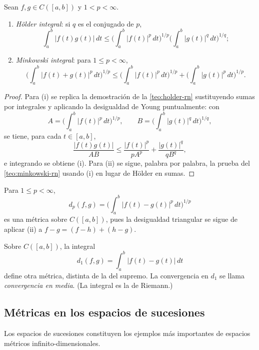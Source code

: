 \begin{theorem}
\label{teo:desigualdades-integrales}
Sean $f,g\in C([a,b])$ y $1<p<\infty$.
\begin{enumerate}
  \item[(i)] \emph{Hölder integral}: si $q$ es el conjugado de $p$,
  \[
    \int_a^b|f(t)g(t)|\,dt\leq\biggl(\int_a^b|f(t)|^p\,dt\biggr)^{1/p}\biggl(\int_a^b|g(t)|^q\,dt\biggr)^{1/q};
  \]
  \item[(ii)] \emph{Minkowski integral}: para $1\leq p<\infty$,
  \[
    \biggl(\int_a^b|f(t)+g(t)|^p\,dt\biggr)^{1/p}\leq\biggl(\int_a^b|f(t)|^p\,dt\biggr)^{1/p}+\biggl(\int_a^b|g(t)|^p\,dt\biggr)^{1/p}.
  \]
\end{enumerate}
\end{theorem}
\begin{proof}
Para (i) se replica la demostración de la \cref{teo:holder-rn} sustituyendo sumas por integrales y aplicando la desigualdad de Young puntualmente: con
\[
A=\biggl(\int_a^b|f(t)|^p\,dt\biggr)^{1/p},\qquad
B=\biggl(\int_a^b|g(t)|^q\,dt\biggr)^{1/q},
\]
se tiene, para cada $t\in[a,b]$,
\[
\frac{|f(t)g(t)|}{AB}\leq\frac{|f(t)|^p}{pA^p}+\frac{|g(t)|^q}{qB^q},
\]
e integrando se obtiene (i). Para (ii) se sigue, palabra por palabra, la prueba del \cref{teo:minkowski-rn} usando (i) en lugar de Hölder en sumas.
\end{proof}

\begin{corollary}
\label{cor:lp-metrica}
Para $1\leq p<\infty$,
\[
  d_p(f,g)=\biggl(\int_a^b|f(t)-g(t)|^p\,dt\biggr)^{1/p}
\]
es una métrica sobre $C([a,b])$, pues la desigualdad triangular se sigue de aplicar (ii) a $f-g=(f-h)+(h-g)$.
\end{corollary}

\begin{example}
\label{ej:l1}
Sobre $C([a,b])$, la integral
\[
  d_1(f,g)=\int_a^b|f(t)-g(t)|\,dt
\]
define otra métrica, distinta de la del supremo. La convergencia en $d_1$ se llama \emph{convergencia en media}. (La integral es la de Riemann.)
\end{example}

\subsection{Métricas en los espacios de sucesiones}

Los espacios de sucesiones constituyen los ejemplos más importantes de espacios métricos infinito-dimensionales.

